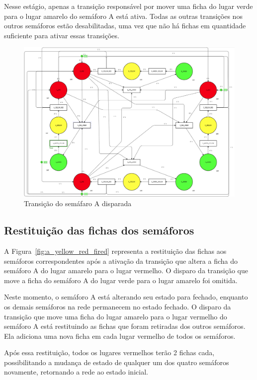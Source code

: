 Nesse estágio, apenas a transição responsável por mover uma ficha do lugar verde para o lugar amarelo do semáforo A está ativa.
Todas as outras transições nos outros semáforos estão desabilitadas, uma vez que não há fichas em quantidade suficiente para ativar essas transições.

\begin{figure}[ht]
	\centering
	\includegraphics[width=1\textwidth]{images/a_red_green_fired.png}
	\caption{Transição do semáfaro A disparada}
    \label{fig:a_red_green_fired}
\end{figure}


\subsection{Restituição das fichas dos semáforos}

A Figura~\ref{fig:a_yellow_red_fired} representa a restituição das fichas aos semáforos correspondentes após a ativação da transição que altera a ficha do semáforo A do lugar amarelo para o lugar vermelho.
O disparo da transição que move a ficha do semáforo A do lugar verde para o lugar amarelo foi omitida.

Neste momento, o semáforo A está alterando seu estado para fechado, enquanto os demais semáforos na rede permanecem no estado fechado.
O disparo da transição que move uma ficha do lugar amarelo para o lugar vermelho do semáforo A está restituindo as fichas que foram retiradas dos outros semáforos.
Ela adiciona uma nova ficha em cada lugar vermelho de todos os semáforos.

Após essa restituição, todos os lugares vermelhos terão 2 fichas cada, possibilitando a mudança de estado de qualquer um dos quatro semáforos novamente, retornando a rede ao estado inicial.

